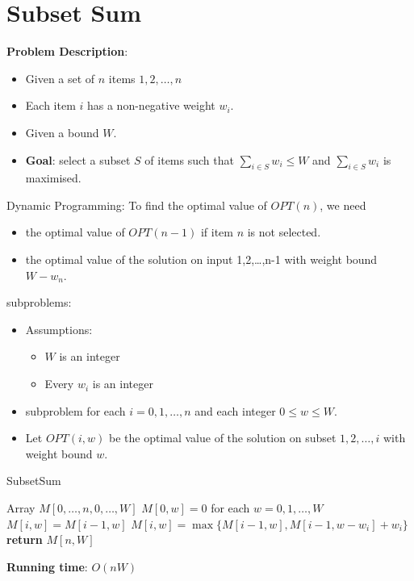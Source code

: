 \documentclass[onecolumn]{report}
\begin{document}
\section{Subset Sum}
\textbf{Problem Description}:
\begin{itemize}
    \item Given a set of $n$ items ${1,2,\dots,n}$
    \item Each item $i$ has a non-negative weight $w_i$.
    \item Given a bound $W$.
    \item \textbf{Goal}: select a subset $S$ of items such that $\sum_{i\in S}w_i\leq W$ and $\sum_{i\in S}w_i$ is maximised.
\end{itemize}
Dynamic Programming:
To find the optimal value of $OPT(n)$, we need
\begin{itemize}
    \item the optimal value of $OPT(n-1)$ if item $n$ is not selected.
    \item the optimal value of the solution on input {1,2,\dots,n-1} with weight bound $W-w_n$.
\end{itemize}
subproblems:
\begin{itemize}
    \item Assumptions:
    \begin{itemize}
        \item $W$ is an integer
        \item Every $w_i$ is an integer
    \end{itemize}
    \item subproblem for each $i=0,1,\dots,n$ and each integer $0 \leq w \leq W$.
    \item Let $OPT(i,w)$ be the optimal value of the solution on subset ${1,2,\dots,i}$ with weight bound $w$.
\end{itemize}
\begin{algorithm}[H]
\caption{SubsetSum}
\begin{algorithmic}
        \State Array $M[0,\dots,n,0,\dots,W]$
        \State $M[0,w]=0$ for each $w=0,1,\dots,W$
                    \State $M[i,w]=M[i-1,w]$
                \Else
                    \State $M[i,w]=\max\{M[i-1,w],M[i-1,w-w_i]+w_i\}$
                \EndIf
            \EndFor
        \EndFor
        \State \textbf{return} $M[n,W]$
    \EndProcedure
\end{algorithmic}
\end{algorithm}
\noindent
\textbf{Running time}: $O(nW)$\\
\end{document}
